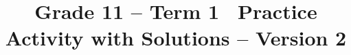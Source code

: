 \makeatletter
{}
\makeatother



\title{Grade 11 -- Term 1 \ Practice Activity with Solutions -- Version 2}
\author{}
\date{}

\pagestyle{empty}


\newcommand{\SolvedGraph}[2]{%
	\par\smallskip
	\Needspace{4.6cm}%
	\begin{center}
		\textbf{\small #1}\par\vspace{-1mm}
		\resizebox{0.39\textwidth}{!}{%
			\begin{minipage}{10cm}
				#2
			\end{minipage}%
		}
	\end{center}
	\vspace{-2mm}%
}

\newcommand{\SolutionStage}[2]{%
	\Needspace{6\baselineskip}%
	\subsection{#2}%
}



